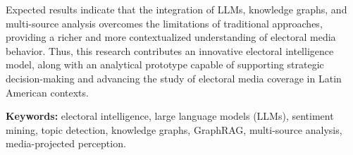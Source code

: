 Expected results indicate that the integration of LLMs, knowledge graphs, and multi-source analysis overcomes the limitations of traditional approaches, providing a richer and more contextualized understanding of electoral media behavior. Thus, this research contributes an innovative electoral intelligence model, along with an analytical prototype capable of supporting strategic decision-making and advancing the study of electoral media coverage in Latin American contexts.

\textbf{Keywords: } electoral intelligence, large language models (LLMs), sentiment mining, topic detection, knowledge graphs, GraphRAG, multi-source analysis, media-projected perception.